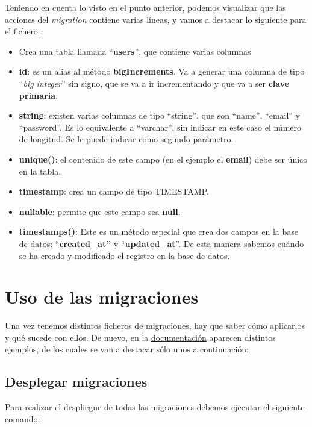 Teniendo en cuenta lo visto en el punto anterior, podemos visualizar que las acciones del \textit{migration} contiene varias líneas, y vamos a destacar lo siguiente para el fichero :

\begin{itemize}
    \item Crea una tabla llamada “\textbf{users}”, que contiene varias columnas
    \item \textbf{id}: es un alias al método \textbf{bigIncrements}. Va a generar una columna de tipo “\textit{big integer}” sin signo, que se va a ir incrementando y que va a ser \textbf{clave primaria}.

    \item \textbf{string}: existen varias columnas de tipo “string”, que son “name”, “email” y “password”. Es lo equivalente a “varchar”, sin indicar en este caso el número de longitud. Se le puede indicar como segundo parámetro.
    \item \textbf{unique()}: el contenido de este campo (en el ejemplo el \textbf{email}) debe ser único en la tabla.
    \item \textbf{timestamp}: crea un campo de tipo TIMESTAMP.
    \item \textbf{nullable}: permite que este campo sea \textbf{null}.

    \item \textbf{timestamps()}: Este es un método especial que crea dos campos en la base de datos: “\textbf{created\_at”} y “\textbf{updated\_at}”. De esta manera sabemos cuándo se ha creado y modificado el registro en la base de datos.
\end{itemize}


\section{Uso de las migraciones}

Una vez tenemos distintos ficheros de migraciones, hay que saber cómo aplicarlos y qué sucede con ellos. De nuevo, en la \href{https://laravel.com/docs/10.x/migrations#running-migrations}{documentación} aparecen distintos ejemplos, de los cuales se van a destacar sólo unos a continuación:

\subsection{Desplegar migraciones}
Para realizar el despliegue de todas las migraciones debemos ejecutar el siguiente comando:

